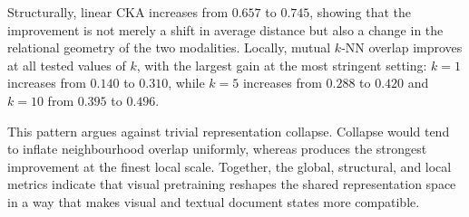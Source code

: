 Structurally, linear CKA increases from $0.657$ to $0.745$, showing that the improvement is not merely a shift in average distance but also a change in the relational geometry of the two modalities. Locally, mutual $k$-NN overlap improves at all tested values of $k$, with the largest gain at the most stringent setting: $k{=}1$ increases from $0.140$ to $0.310$, while $k{=}5$ increases from $0.288$ to $0.420$ and $k{=}10$ from $0.395$ to $0.496$.

This pattern argues against trivial representation collapse. Collapse would tend to inflate neighbourhood overlap uniformly, whereas \methodname produces the strongest improvement at the finest local scale. Together, the global, structural, and local metrics indicate that visual pretraining reshapes the shared representation space in a way that makes visual and textual document states more compatible.